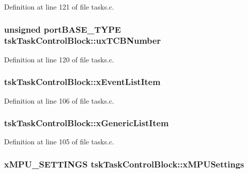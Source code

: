Definition at line 121 of file tasks.\-c.

\hypertarget{structtsk_task_control_block_ad1aa61c9b3fdb1483a52a0813635d964}{
\subsubsection[{ux\-T\-C\-B\-Number}]{\setlength{\rightskip}{0pt plus 5cm}unsigned port\-B\-A\-S\-E\-\_\-\-T\-Y\-P\-E tsk\-Task\-Control\-Block\-::ux\-T\-C\-B\-Number}}\label{structtsk_task_control_block_ad1aa61c9b3fdb1483a52a0813635d964}


Definition at line 120 of file tasks.\-c.

\hypertarget{structtsk_task_control_block_a9b0ee1554f116853c7631dc0b585ffdc}{
\subsubsection[{x\-Event\-List\-Item}]{ tsk\-Task\-Control\-Block\-::x\-Event\-List\-Item}}\label{structtsk_task_control_block_a9b0ee1554f116853c7631dc0b585ffdc}


Definition at line 106 of file tasks.\-c.

\hypertarget{structtsk_task_control_block_a95eb5853a94644043605770f63ac9a63}{
\subsubsection[{x\-Generic\-List\-Item}]{ tsk\-Task\-Control\-Block\-::x\-Generic\-List\-Item}}\label{structtsk_task_control_block_a95eb5853a94644043605770f63ac9a63}


Definition at line 105 of file tasks.\-c.

\hypertarget{structtsk_task_control_block_a6f500824434d6eb2ddd3df036f33cdac}{
\subsubsection[{x\-M\-P\-U\-Settings}]{\setlength{\rightskip}{0pt plus 5cm}x\-M\-P\-U\-\_\-\-S\-E\-T\-T\-I\-N\-G\-S tsk\-Task\-Control\-Block\-::x\-M\-P\-U\-Settings}}\label{structtsk_task_control_block_a6f500824434d6eb2ddd3df036f33cdac}


